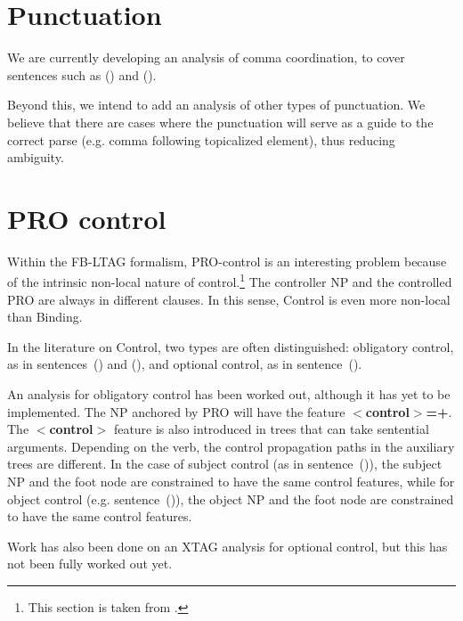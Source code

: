 \section{Punctuation}

We are currently developing an analysis of comma coordination, to
cover sentences such as () and ().


Beyond this, we intend to add an analysis of other types of punctuation. We
believe that there are cases where the punctuation will serve as a guide to the
correct parse (e.g. comma following topicalized element), thus reducing
ambiguity.


\section{PRO control}

Within the FB-LTAG formalism, PRO-control is an interesting problem because of
the intrinsic non-local nature of control.\footnote{This section is taken from
\cite{bhatt94}.}  The controller NP and the controlled PRO are always in
different clauses.  In this sense, Control is even more non-local than Binding.

In the literature on Control, two types are often distinguished: obligatory
control, as in sentences~() and (), and optional control, as in
sentence~().


An analysis for obligatory control has been worked out, although it has yet to
be implemented.  The NP anchored by PRO will have the feature {\bf
$<$control$>$=+}.  The {\bf $<$control$>$} feature is also introduced in trees
that can take sentential arguments.  Depending on the verb, the control
propagation paths in the auxiliary trees are different.  In the case of subject
control (as in sentence~()), the subject NP and the foot node are
constrained to have the same control features, while for object control
(e.g. sentence~()), the object NP and the foot node are constrained to
have the same control features. 

Work has also been done on an XTAG analysis for optional control, but this has
not been fully worked out yet.




